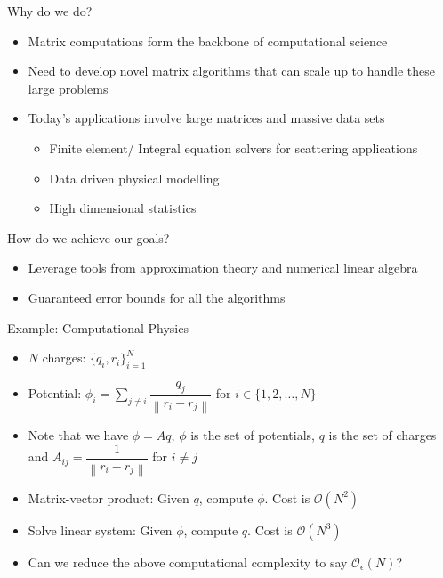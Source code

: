 \documentclass{beamer}
\newcommand{\dsum}{\displaystyle\sum}
\newcommand{\magn}[1]{\left\lVert#1\right\rVert}
\begin{document}
\begin{frame}{Why do we do?}
	\begin{itemize}
		\item
		Matrix computations form the backbone of computational science
		\item
		Need to develop novel matrix algorithms that can scale up to handle these large problems
		\item
		Today’s applications involve large matrices and massive data sets
		\begin{itemize}
			\item
			Finite element/ Integral equation solvers for scattering applications
			\item
			Data driven physical modelling
			\item
			High dimensional statistics
		\end{itemize}
	\end{itemize}
\end{frame}

\begin{frame}{How do we achieve our goals?}
	\begin{itemize}
		\item
		Leverage tools from approximation theory and numerical linear algebra
		\item
		Guaranteed error bounds for all the algorithms
	\end{itemize}
\end{frame}

\begin{frame}{Example: Computational Physics}
	\begin{itemize}
		\item
		$N$ charges: $\{q_i,r_i\}_{i=1}^N$
		\item
		Potential: $\phi_i = \dsum_{j \neq i} \dfrac{q_j}{\magn{r_i-r_j}}$ for $i \in \{1,2,\ldots,N\}$
		\item
		Note that we have $\phi = Aq$, $\phi$ is the set of potentials, $q$ is the set of charges and $A_{ij} = \dfrac1{\magn{r_i-r_j}}$ for $i \neq j$
		\item
		Matrix-vector product: Given $q$, compute $\phi$. Cost is $\mathcal{O}(N^2)$
		\item
		Solve linear system: Given $\phi$, compute $q$. Cost is $\mathcal{O}(N^3)$
		\item
		Can we reduce the above computational complexity to say $\mathcal{O}_{\epsilon}(N)$?
	\end{itemize}
\end{frame}
\end{document}
